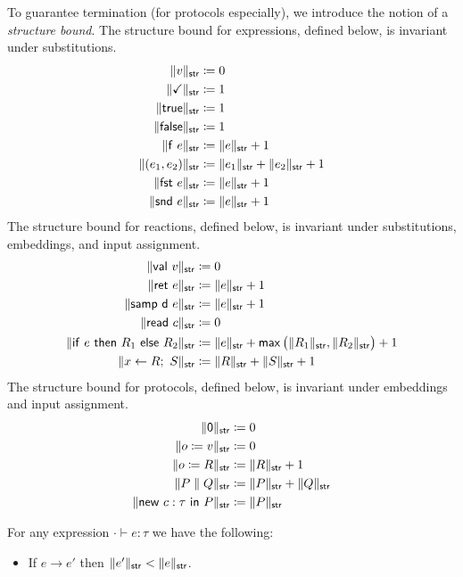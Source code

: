 \noindent To guarantee termination (for protocols especially), we introduce the notion of a \emph{structure bound}. The structure bound for expressions, defined below, is invariant under substitutions.
\begin{align*}
\snorm{v} & \coloneqq 0 \\
\snorm{\checkmark} & \coloneqq 1 \\
\snorm{\true} & \coloneqq 1 \\
\snorm{\false} & \coloneqq 1 \\
\snorm{\func \ e} & \coloneqq \snorm{e} + 1 \\
\snorm{(e_1,e_2)} & \coloneqq \snorm{e_1} + \snorm{e_2} + 1 \\
\snorm{\fst \ e} & \coloneqq \snorm{e} + 1 \\
\snorm{\snd \ e} & \coloneqq \snorm{e} + 1
\end{align*}
\noindent The structure bound for reactions, defined below, is invariant under substitutions, embeddings, and input assignment.
\begin{align*}
\snorm{\val{v}} & \coloneqq 0 \\
\snorm{\ret{e}} & \coloneqq \snorm{e} + 1 \\
\snorm{\samp{\dist}{e}} & \coloneqq \snorm{e} + 1 \\
\snorm{\read{c}} & \coloneqq 0 \\
\snorm{\ifte{e}{R_1}{R_2}} & \coloneqq \snorm{e} + \mathsf{max} \, \big(\snorm{R_1}, \snorm{R_2}\big) + 1 \\
\snorm{x \leftarrow R; \ S} & \coloneqq \snorm{R} + \snorm{S} + 1
\end{align*}
\noindent The structure bound for protocols, defined below, is invariant under embeddings and input assignment.
\begin{align*}
\snorm{\zero} & \coloneqq 0 \\
\snorm{\assign{o}{v}} & \coloneqq 0 \\
\snorm{\assign{o}{R}} & \coloneqq \snorm{R} + 1 \\
\snorm{\Par{P}{Q}} & \coloneqq \snorm{P} + \snorm{Q} \\
\snorm{\new{c}{\tau}{P}} & \coloneqq \snorm{P}
\end{align*}

\begin{lemma}
For any expression $\cdot \vdash e : \tau$ we have the following:
\begin{itemize}
\item If $e \to e'$ then $\snorm{e'} < \snorm{e}$.
\end{itemize}
\end{lemma}

